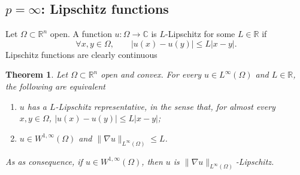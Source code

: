 \documentclass[a4paper,9pt]{amsart}
\newcommand{\R}{\mathbb{R}}	%
\newcommand{\C}{\mathbb{C}}	%
\newcommand{\grad}{\nabla}
\theoremstyle{plain}
\newtheorem{theorem}[proposition]{Theorem}
\theoremstyle{definition}
\theoremstyle{remark}
\begin{document}
\subsection{$p=\infty$: Lipschitz functions}
Let $\Omega\subset\R^n$ open.
A function $u:\Omega\to\C$ is $L$-Lipschitz for some $L\in\R$ if
\begin{equation}
	\forall x,y\in\Omega,\qquad
	|u(x)-u(y)| \le L |x-y| .
\end{equation}
Lipschitz functions are clearly continuous

\begin{theorem}\label{thm68178f84}
	Let $\Omega\subset\R^n$ open and convex.
	For every $u\in L^\infty(\Omega)$ and $L\in\R$,
	the following are equivalent
	\begin{enumerate}[label=(\roman*)]
	\item\label{thm68178f84_1}
	$u$ has a $L$-Lipschitz representative, in the sense that, for almost every $x,y\in\Omega$, $|u(x)-u(y)| \le L |x-y|$;
	\item\label{thm68178f84_2}
	$u\in W^{1,\infty}(\Omega)$ and $\|\grad u\|_{L^\infty(\Omega)}\le L$.
	\end{enumerate}
	As as consequence, if $u\in W^{1,\infty}(\Omega)$, then $u$ is $\|\grad u\|_{L^\infty(\Omega)}$-Lipschitz.
\end{theorem}
\end{document}
